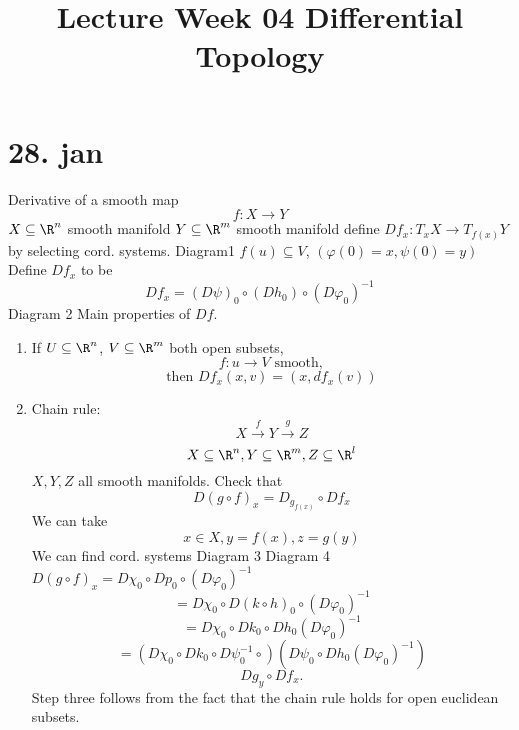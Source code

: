 \title{Lecture Week 04 Differential Topology}
\maketitle
\section{28. jan}
Derivative of a smooth map
  $$f:X\to Y$$
$X \subseteq \R^n $ smooth manifold
\newline
$Y \subseteq \R^m$ smooth manifold
\newline define $Df_x:T_xX\to T_{f(x)}Y$
by selecting cord. systems.
\newline Diagram1
\newline
$f(u)\subseteq V$, $\left(\varphi (0)=x, \psi(0)=y\right)$
Define $Df_x$ to be
  $$Df_x=(D\psi)_0\circ(Dh_0)\circ(D\varphi_0) ^{-1}$$
Diagram 2
\newline
Main properties of $Df$.
\begin{enumerate}[(1)]
  \item If $U \subseteq \R^n $, $V \subseteq \R^m$ both open subsets,
    $$f:u\to V \text{ smooth},$$
    $$\text{then }Df_x(x,v)=(x,df_x(v))$$
  \item Chain rule:
  $$X\xrightarrow{f}Y\xrightarrow{g}Z$$
  $$X \subseteq \R^n , Y \subseteq \R^m, Z \subseteq \R^l$$
  $X,Y,Z$ all smooth manifolds.
  Check that
    $$D(g\circ f)_x=D_{g_{f(x)}}\circ Df_x$$
  We can take
    $$x\in X,y=f(x), z=g(y)$$
  We can find cord. systems
  \newline Diagram 3
  \newline Diagram 4
  \newline $D(g\circ f)_x=D\chi_0\circ Dp_0\circ(D \varphi _0) ^{-1}$
    $$=D\chi_0\circ D(k\circ h)_0\circ(D \varphi _0) ^{-1}$$
    $$=D\chi_0\circ Dk_0\circ Dh_0(D \varphi _0) ^{-1}$$
    $$=\left(D\chi_0\circ Dk_0\circ D\psi_0 ^{-1}\circ \right) \left(D\psi_0\circ Dh_0(D \varphi _0) ^{-1}\right)$$
    $$Dg_y\circ Df_x.$$
    Step three follows from the fact that the chain rule holds for open euclidean subsets.
\end{enumerate}
